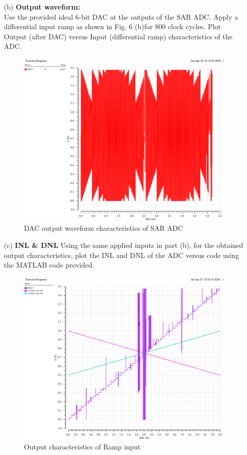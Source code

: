 \documentclass[a4paper,12pt]{article}
\begin{document}
\begin{itemize}
    

    \item[(b)] \textbf{Output waveform:}\\
    Use the provided ideal 6-bit DAC at the outputs of the SAR ADC. Apply a
differential input ramp as shown in Fig. 6 (b)for 800 clock cycles. Plot Output (after DAC) versus Input (differential ramp) characteristics of the ADC.
    \begin{figure}[H]
        \centering
        \includegraphics[max width = \textwidth]{3/3_DAC_VOUT.png}
        \caption{DAC output waveform characteristics of SAR ADC}
        \label{fig:enter-label}
    \end{figure}

    \item[(c)] \textbf{INL & DNL}
    Using the same applied inputs in part (b), for the obtained output characteristics, plot the INL and DNL of the ADC versus code using the MATLAB code provided.
    \begin{figure}[H]
        \centering
        \includegraphics[max width = \textwidth]{3/3_VOUT_RAMP.png}
        \caption{Output characteristics of Ramp input}
        \label{fig:enter-label}
    \end{figure}


\end{itemize}
\end{document}

